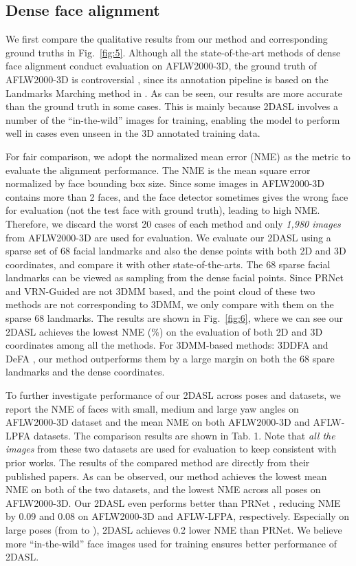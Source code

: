\documentclass[10pt,twocolumn,letterpaper]{article}
\begin{document}
{\subsection{Dense face alignment}
We first compare the qualitative results from our method and corresponding ground truths in Fig.~\ref{fig:5}. Although all the state-of-the-art methods of dense face alignment conduct evaluation on AFLW2000-3D, the ground truth of AFLW2000-3D is  controversial \cite{bulat2017far, yu2017learning}, since its annotation pipeline is based on the Landmarks Marching method in \cite{zhu2015high}. As can be seen, our results are more accurate than the ground truth in some cases. This is mainly because 2DASL involves a number of the ``in-the-wild'' images for training, enabling the model to perform well in cases even unseen in the 3D annotated training data.

For fair comparison, we adopt the normalized mean error (NME) \cite{zhu2016face} as the metric to evaluate the alignment performance. The NME is the mean square error normalized by face bounding box size. Since some images in AFLW2000-3D contains more than 2 faces, and the face detector sometimes gives the wrong face for evaluation (not the test face with ground truth), leading to high NME. Therefore, we discard the worst 20 cases of each method and only \textit{1,980 images} from AFLW2000-3D are used for evaluation. We evaluate our 2DASL using a sparse set of 68 facial landmarks and also the dense points with both 2D and 3D coordinates, and compare it  with other state-of-the-arts. The 68 sparse facial landmarks can be viewed as sampling from the dense facial points. Since PRNet \cite{feng2018joint} and VRN-Guided \cite{jackson2017large} are not 3DMM based, and the point cloud of these two methods are not corresponding to 3DMM, we only compare with them on the sparse 68 landmarks. The results are shown in Fig.~\ref{fig:6}, where we can see our 2DASL achieves the lowest NME (\%) on the evaluation of both 2D and 3D coordinates among all the methods. For 3DMM-based methods: 3DDFA \cite{zhu2016face} and DeFA \cite{liu2017dense}, our method outperforms them by a large margin on both the 68 spare landmarks and the dense coordinates.

To further investigate   performance of our 2DASL across poses and datasets, we report the NME   of faces with small, medium and large yaw angles on AFLW2000-3D dataset and the mean NME   on both AFLW2000-3D and AFLW-LPFA datasets. The comparison results are shown in Tab. 1. Note that \textit{all the images} from these two datasets are used for evaluation to keep consistent with prior works. The results of the compared method are directly from their published papers. As can be observed, our method achieves the lowest mean NME on both of the two datasets, and the lowest NME   across all poses on AFLW2000-3D. Our 2DASL even performs better than PRNet \cite{feng2018joint}, reducing NME by 0.09 and 0.08 on AFLW2000-3D and AFLW-LFPA, respectively. Especially on large poses (from  to ), 2DASL achieves 0.2 lower NME than PRNet. We believe more ``in-the-wild'' face images used for training ensures better performance of 2DASL.

}
\end{document}
